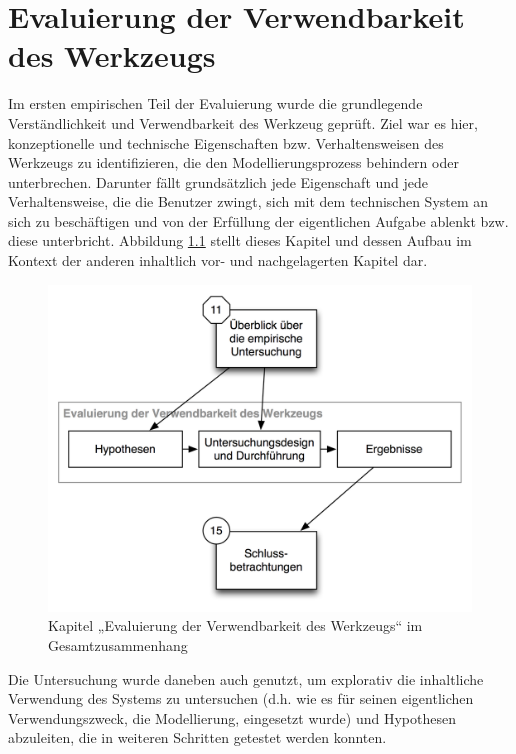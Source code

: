 \chapter{Evaluierung der Verwendbarkeit des Werkzeugs} %
\label{cha:eval_werkzeug}

Im ersten empirischen Teil der Evaluierung wurde die grundlegende Verständlichkeit und Verwendbarkeit des Werkzeug geprüft. Ziel war es hier, konzeptionelle und technische Eigenschaften bzw. Verhaltensweisen des Werkzeugs zu identifizieren, die den Modellierungsprozess behindern oder unterbrechen. Darunter fällt grundsätzlich jede Eigenschaft und jede Verhaltensweise, die die Benutzer zwingt, sich mit dem technischen System an sich zu beschäftigen und von der Erfüllung der eigentlichen Aufgabe ablenkt bzw. diese unterbricht. Abbildung \ref{fig:img_Kontextgrafiken_k12} stellt dieses Kapitel und dessen Aufbau im Kontext der anderen inhaltlich vor- und nachgelagerten Kapitel dar.

\begin{figure}[htbp]
	\centering
		\includegraphics[scale=0.6]{img/Kontextgrafiken/k12.png}
	\caption{Kapitel „Evaluierung der Verwendbarkeit des Werkzeugs“ im Gesamtzusammenhang}
	\label{fig:img_Kontextgrafiken_k12}
\end{figure}

Die Untersuchung wurde daneben auch genutzt, um explorativ die inhaltliche Verwendung des Systems zu untersuchen (d.h. wie es für seinen eigentlichen Verwendungszweck, die Modellierung, eingesetzt wurde) und Hypothesen abzuleiten, die in weiteren Schritten getestet werden konnten.

